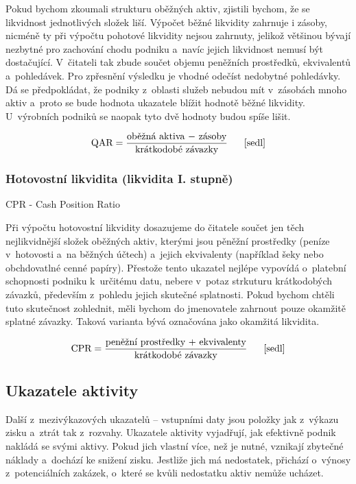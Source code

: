 Pokud bychom zkoumali strukturu oběžných aktiv, zjistili bychom, že se likvidnost jednotlivých složek liší. Výpočet běžné likvidity zahrnuje i zásoby, nicméně ty při výpočtu pohotové likvidity nejsou zahrnuty, jelikož většinou bývají nezbytné pro zachování chodu podniku a~navíc jejich likvidnost nemusí být dostačující.
V~čitateli tak zbude součet objemu peněžních prostředků, ekvivalentů a~pohledávek. Pro zpřesnění výsledku je vhodné odečíst nedobytné pohledávky.
Dá se předpokládat, že podniky z~oblasti služeb nebudou mít v~zásobách mnoho aktiv a~proto se bude hodnota ukazatele blížit hodnotě běžné likvidity. U~výrobních podniků se naopak tyto dvě hodnoty budou spíše lišit.

$$\vz{QAR}{oběžná aktiva $-$ zásoby}{krátkodobé závazky} \scite{sedl}$$

\subsubsection{Hotovostní likvidita (likvidita I. stupně)}
CPR - Cash Position Ratio

Při výpočtu hotovostní likvidity dosazujeme do čitatele součet jen těch nejlikvidnější složek oběžných aktiv, kterými jsou pěněžní prostředky (peníze v~hotovosti a~na běžných účtech) a~jejich ekvivalenty (například šeky nebo obchdovatlné cenné papíry).
Přestože tento ukazatel nejlépe vypovídá o~platební schopnosti podniku k~určitému datu, nebere v~potaz strkuturu krátkodobých závazků, především z~pohledu jejich skutečné splatnosti\cite{mendelu}. Pokud bychom chtěli tuto skutečnost zohlednit, měli bychom do jmenovatele zahrnout pouze okamžitě splatné závazky. Taková varianta bývá označována jako okamžitá likvidita.


$$\vz{CPR}{peněžní prostředky $+$ ekvivalenty}{krátkodobé závazky} \scite{sedl}$$








\subsection{Ukazatele aktivity}
Další z~mezivýkazových ukazatelů -- vstupními daty jsou položky jak z~výkazu zisku a~ztrát tak z~rozvahy. Ukazatele aktivity vyjadřují, jak efektivně podnik nakládá se svými aktivy. Pokud jich vlastní více, než je nutné, vznikají zbytečné náklady a~dochází ke snižení zisku. Jestliže jich má nedostatek, přichází o~výnosy z~potenciálních zakázek, o~které se kvůli nedostatku aktiv nemůže ucházet.

